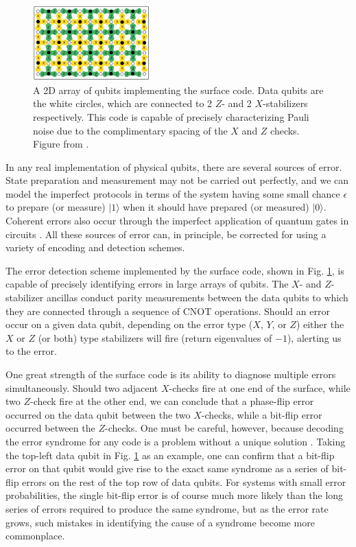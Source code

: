 \begin{figure}
  \centering
  \includegraphics[width=0.4\textwidth]{images/surface_code.png}
  \caption{A 2D array of qubits implementing the surface code. Data qubits are
    the white circles, which are connected to 2 $Z$- and 2 $X$-stabilizers
    respectively. This code is capable of precisely characterizing Pauli noise
    due to the complimentary spacing of the $X$ and $Z$ checks. Figure from
    \cite{fowler12_surfac_codes}.}
  \label{fig:surface_code}
\end{figure}

In any real implementation of physical qubits, there are several sources of
error. State preparation and measurement may not be carried out perfectly, and
we can model the imperfect protocols in terms of the system having some small
chance $\epsilon$ to prepare (or measure) $|1\rangle$ when it should have
prepared (or measured) $|0\rangle$. Coherent errors also occur through the
imperfect application of quantum gates in circuits \cite{Devitt_2013}. All these
sources of error can, in principle, be corrected for using a variety of encoding
and detection schemes.

The error detection scheme implemented by the surface code, shown in Fig.
\ref{fig:surface_code}, is capable of precisely identifying errors in large
arrays of qubits. The $X$- and $Z$-stabilizer ancillas conduct parity
measurements between the data qubits to which they are connected through a
sequence of CNOT operations. Should an error occur on a given data qubit,
depending on the error type ($X$, $Y$, or $Z$) either the $X$ or $Z$ (or both) type
stabilizers will fire (return eigenvalues of $-1$), alerting us to the error. 

One great strength of the surface code is its ability to diagnose multiple
errors simultaneously. Should two adjacent $X$-checks fire at one end of the
surface, while two $Z$-check fire at the other end, we can conclude that a
phase-flip error occurred on the data qubit between the two $X$-checks, while a
bit-flip error occurred between the $Z$-checks. One must be careful, however,
because decoding the error syndrome for any code is a problem without a unique
solution \cite{terhal15}. Taking the top-left data qubit in Fig. \ref{fig:surface_code} as an
example, one can confirm that a bit-flip error on that qubit would give rise to
the exact same syndrome as a series of bit-flip errors on the rest of the top
row of data qubits. For systems with small error probabilities, the single
bit-flip error is of course much more likely than the long series of errors
required to produce the same syndrome, but as the error rate grows, such
mistakes in identifying the cause of a syndrome become more commonplace. 

